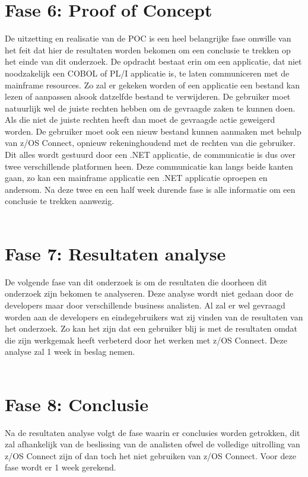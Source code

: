 \section{Fase 6: Proof of Concept}
\label{sec:Proof of Concept}
De uitzetting en realisatie van de POC is een heel belangrijke fase omwille van het feit dat hier de resultaten worden bekomen om een conclusie te trekken op het einde van dit onderzoek. De opdracht bestaat erin om een applicatie, dat niet noodzakelijk een COBOL of PL/I applicatie is, te laten communiceren met de mainframe resources. Zo zal er gekeken worden of een applicatie een bestand kan lezen of aanpassen alsook datzelfde bestand te verwijderen. De gebruiker moet natuurlijk wel de juiste rechten hebben om de gevraagde zaken te kunnen doen. Als die niet de juiste rechten heeft dan moet de gevraagde actie geweigerd worden. De gebruiker moet ook een nieuw bestand kunnen aanmaken met behulp van z/OS Connect, opnieuw rekeninghoudend met de rechten van die gebruiker. Dit alles wordt gestuurd door een .NET applicatie, de communicatie is dus over twee verschillende platformen heen. Deze communicatie kan langs beide kanten gaan, zo kan een mainframe applicatie een .NET applicatie oproepen en andersom. Na deze twee en een half week durende fase is alle informatie om een conclusie te trekken aanwezig.
\\ \\
\section{Fase 7: Resultaten analyse}
\label{sec:Fase 7: Resultaten analyse}
De volgende fase van dit onderzoek is om de resultaten die doorheen dit onderzoek zijn bekomen te analyseren. Deze analyse wordt niet gedaan door de developers maar door verschillende business analisten. Al zal er wel gevraagd worden aan de developers en eindegebruikers wat zij vinden van de resultaten van het onderzoek. Zo kan het zijn dat een gebruiker blij is met de resultaten omdat die zijn werkgemak heeft verbeterd door het werken met z/OS Connect. Deze analyse zal 1 week in beslag nemen.
\\ \\
\section{Fase 8: Conclusie}
\label{sec:Fase 8: Conclusie}
Na de resultaten analyse volgt de fase waarin er conclusies worden getrokken, dit zal afhankelijk van de beslissing van de analisten ofwel de volledige uitrolling van z/OS Connect zijn of dan toch het niet gebruiken van z/OS Connect. Voor deze fase wordt er 1 week gerekend.
\\ \\
